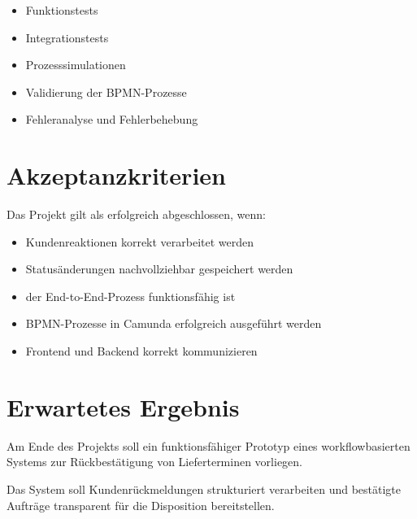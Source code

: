 \documentclass[12pt,a4paper]{article}
\begin{document}
\begin{itemize}
    \item Funktionstests
    \item Integrationstests
    \item Prozesssimulationen
    \item Validierung der BPMN-Prozesse
    \item Fehleranalyse und Fehlerbehebung
\end{itemize}

\section{Akzeptanzkriterien}

Das Projekt gilt als erfolgreich abgeschlossen, wenn:

\begin{itemize}
    \item Kundenreaktionen korrekt verarbeitet werden
    \item Statusänderungen nachvollziehbar gespeichert werden
    \item der End-to-End-Prozess funktionsfähig ist
    \item BPMN-Prozesse in Camunda erfolgreich ausgeführt werden
    \item Frontend und Backend korrekt kommunizieren
\end{itemize}

\section{Erwartetes Ergebnis}

Am Ende des Projekts soll ein funktionsfähiger Prototyp eines workflowbasierten Systems zur Rückbestätigung von Lieferterminen vorliegen. 

Das System soll Kundenrückmeldungen strukturiert verarbeiten und bestätigte Aufträge transparent für die Disposition bereitstellen.

\end{document}
